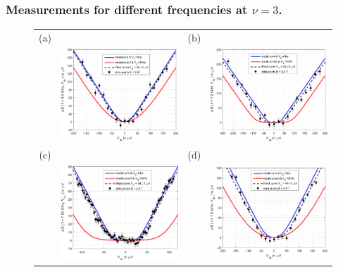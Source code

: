 \subsubsection*{Measurements for different frequencies at $\nu=3$.}

\begin{figure}[hptb]
	\begin{center}
		\begin{tabular}{c c c c}
			(a) & & (b) & \\
			& \includegraphics[width = 6.5 cm]{./chap2/nu_3_RF_noise_vs_Vdc_at_3_5GHz} &
			& \includegraphics[width = 6.5 cm]{./chap2/nu_3_RF_noise_vs_Vdc_at_7_2GHz} \\
			(c) & & (d) & \\
			& \includegraphics[width = 6.5 cm]{./chap2/nu_3_RF_noise_vs_Vdc_at_7_25GHz} &
			& \includegraphics[width = 6.5 cm]{./chap2/nu_3_RF_noise_vs_Vdc_at_7_5GHz} \\

\end{tabular}
\end{center}
\end{figure}
